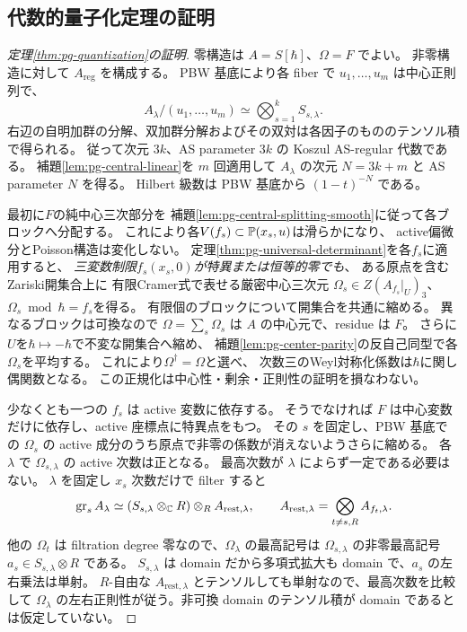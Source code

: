 \subsection{代数的量子化定理の証明}
\begin{proof}[定理\ref{thm:pg-quantization}の証明]
零構造は $A=S[\hbar]$、$\Omega=F$ でよい。
非零構造に対して $A_{\mathrm{reg}}$ を構成する。
PBW 基底により各 fiber で $u_1,\ldots,u_m$ は中心正則列で、
\begin{equation}
A_\lambda/(u_1,\ldots,u_m)\simeq\bigotimes_{s=1}^kS_{s,\lambda}.
\end{equation}
右辺の自明加群の分解、双加群分解およびその双対は各因子のもののテンソル積で得られる。
従って次元 $3k$、AS parameter $3k$ の Koszul AS-regular 代数である。
補題\ref{lem:pg-central-linear}を $m$ 回適用して $A_\lambda$ の次元 $N=3k+m$ と AS parameter $N$ を得る。
Hilbert 級数は PBW 基底から $(1-t)^{-N}$ である。

最初に$F$の純中心三次部分を
補題\ref{lem:pg-central-splitting-smooth}に従って各ブロックへ分配する。
これにより各$V(f_s)\subset\mathbb P(x_s,u)$は滑らかになり、
active偏微分とPoisson構造は変化しない。
定理\ref{thm:pg-universal-determinant}を各$f_s$に適用すると、
\emph{三変数制限$f_s(x_s,0)$が特異または恒等的零でも}、
ある原点を含むZariski開集合上に
有限Cramer式で表せる厳密中心三次元
$\Omega_s\in Z(A_{f_s}|_U)_3$、
$\Omega_s\bmod\hbar=f_s$を得る。
有限個のブロックについて開集合を共通に縮める。
異なるブロックは可換なので $\Omega=\sum_s\Omega_s$ は $A$ の中心元で、residue は $F$。
さらに$U$を$\hbar\mapsto-\hbar$で不変な開集合へ縮め、
補題\ref{lem:pg-center-parity}の反自己同型で各$\Omega_s$を平均する。
これにより$\Omega^\dagger=\Omega$と選べ、
次数三のWeyl対称化係数は$\hbar$に関し偶関数となる。
この正規化は中心性・剰余・正則性の証明を損なわない。

少なくとも一つの $f_s$ は active 変数に依存する。
そうでなければ $F$ は中心変数だけに依存し、active 座標点に特異点をもつ。
その $s$ を固定し、PBW 基底での $\Omega_s$ の active 成分のうち原点で非零の係数が消えないようさらに縮める。
各 $\lambda$ で $\Omega_{s,\lambda}$ の active 次数は正となる。
最高次数が $\lambda$ によらず一定である必要はない。
$\lambda$ を固定し $x_s$ 次数だけで filter すると
\begin{equation}
\operatorname{gr}_sA_\lambda\simeq
(S_{s,\lambda}\otimes_\mathbb C R)\otimes_R A_{\mathrm{rest},\lambda},
\qquad A_{\mathrm{rest},\lambda}=\bigotimes_{t\neq s,R}A_{f_t,\lambda}.
\end{equation}
他の $\Omega_t$ は filtration degree 零なので、$\Omega_\lambda$ の最高記号は
$\Omega_{s,\lambda}$ の非零最高記号 $a_s\in S_{s,\lambda}\otimes R$ である。
$S_{s,\lambda}$ は domain だから多項式拡大も domain で、$a_s$ の左右乗法は単射。
$R$-自由な $A_{\mathrm{rest},\lambda}$ とテンソルしても単射なので、最高次数を比較して
$\Omega_\lambda$ の左右正則性が従う。非可換 domain のテンソル積が domain であるとは仮定していない。


\end{proof}
